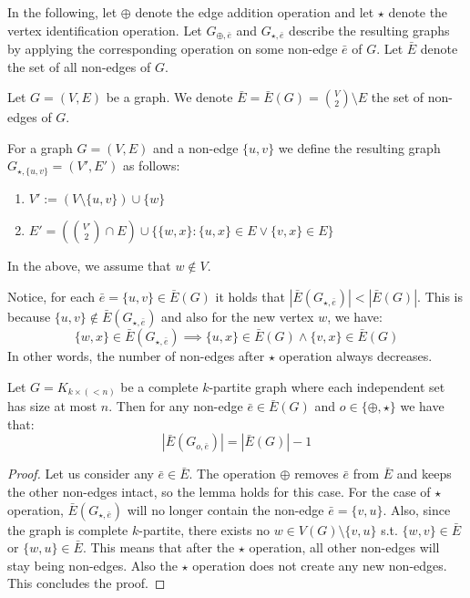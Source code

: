 In the following, let $\oplus$ denote the edge addition operation and let $\star$ denote the vertex identification operation. Let $G_{\oplus,\bar{e}}$ and $G_{\star,\bar{e}}$ describe the resulting graphs by applying the corresponding operation on some non-edge $\bar{e}$ of $G$. Let $\bar{E}$ denote the set of all non-edges of $G$.
\begin{defn}
    Let $G=(V,E)$ be a graph. We denote $\bar{E} = \bar{E}(G) = \binom{V}{2} \setminus E$ the set of non-edges of $G$.
\end{defn}

\begin{defn}
    For a graph $G=(V,E)$ and a non-edge $\{u,v\}$ we define the resulting graph $G_{\star,\{u,v\}} = (V',E')$ as follows:
    \begin{enumerate}
        \item $V' := (V \setminus \{u,v\}) \cup \{w\}$
        \item $E' = (\binom{V'}{2} \cap E) \cup \{\{w,x\} : \{u,x\} \in E \vee \{v,x\} \in E\}$
    \end{enumerate}
    In the above, we assume that $w \notin V$.
\end{defn}

Notice, for each $\bar{e} = \{u,v\}\in \bar{E}(G)$ it holds that $|\bar{E}(G_{\star,\bar{e}})| < |\bar{E}(G)|$. This is because $\{u,v\} \notin \bar{E}(G_{\star,\bar{e}})$ and also for the new vertex $w$, we have: \[\{w,x\} \in \bar{E}(G_{\star,\bar{e}}) \implies \{u,x\} \in \bar{E}(G) \wedge \{v,x\} \in \bar{E}(G)\]
In other words, the number of non-edges after $\star$ operation always decreases.

\begin{lemma}
\label{lemma:non-edge_set_size}
    Let $G = K_{k \times (<n)}$ be a complete $k$-partite graph where each independent set has size at most $n$. Then for any non-edge $\bar{e} \in \bar{E}(G)$ and $o \in \{\oplus,\star\}$ we have that: \[|\bar{E}(G_{o,\bar{e}})| = |\bar{E}(G)| - 1\]
\end{lemma}

\begin{proof}
    Let us consider any $\bar{e} \in \bar{E}$. The operation $\oplus$ removes $\bar{e}$ from $\bar{E}$ and keeps the other non-edges intact, so the lemma holds for this case. For the case of $\star$ operation, $\bar{E}(G_{\star,\bar{e}})$ will no longer contain the non-edge $\bar{e}=\{v,u\}$. Also, since the graph is complete $k$-partite, there exists no $w \in V(G) \setminus \{v,u\}$ s.t. $\{w,v\} \in \bar{E}$ or $\{w,u\} \in \bar{E}$. This means that after the $\star$ operation, all other non-edges will stay being non-edges. Also the $\star$ operation does not create any new non-edges. This concludes the proof.
\end{proof}

